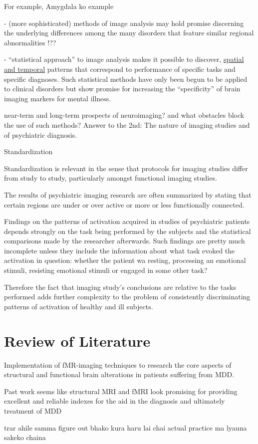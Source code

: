 \documentclass{article}
\begin{document}
For example, Amygdala ko example

- (more sophisticated) methods of image analysis may hold promise
  discerning the underlying differences among the many disorders
  that feature similar regional abnormalities !??


- ``statistical approach'' to image analysis makes it possible to
  discover, \underline{spatial and temporal} patterns that
  correspond to performance of specific tasks and specific
  diagnoses. Such statistical methods have only been begun to be
  applied to clinical disorders but show promise for increasing
  the ``specificity'' of brain imaging markers for mental illness.


near-term and long-term prospects of neuroimaging? and what
obstacles block the use of such methods? Answer to the 2nd: The
nature of imaging studies and of psychiatric diagnosis.

Standardization

Standardization is relevant in the sense that protocols for
imaging studies differ from study to study, particularly amongst
functional imaging studies.

The results of psychiatric imaging research are often summarized
by stating that certain regions are under or over active or more
or less functionally connected.

Findings on the patterns of activation acquired in studies of
psychiatric patients depends strongly on the task being performed
by the subjects and the statistical comparisons made by the
researcher afterwards. Such findings are pretty much incomplete
unless they include the information about what task evoked the
activation in question: whether the patient wa resting, processing
an emotional stimuli, resisting emotional stimuli or engaged in
some other task?

Therefore the fact that imaging study's conclusions are relative
to the tasks performed adds further complexity to the problem of
consistently discriminating patterns of activation of healthy and
ill subjects.

\section{Review of Literature}


Implementation of fMR-imaging techniques to research the core aspects
of structural and functional brain alterations in patients suffering
from MDD.

Past work seems like structural MRI and fMRI look promising for
providing excellent and reliable indexes for the aid in the diagnosis
and ultimately treatment of MDD



trar ahile samma figure out bhako kura haru lai chai actual practice
ma lyauna sakeko chaina
\end{document}
